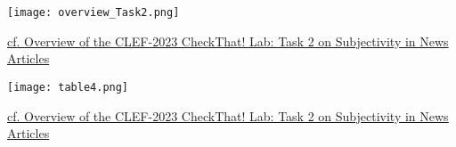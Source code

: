 \documentclass[11pt]{rapport_class}
\begin{document}
\begin{center}
\texttt{[image: overview\_Task2.png]}\\
\begin{tiny}
    \href{https://ceur-ws.org/Vol-3497/paper-020.pdf}{cf. Overview of the CLEF-2023 CheckThat! Lab: Task 2 on
Subjectivity in News Articles}\\
\end{tiny}
\end{center}

\begin{center}
\texttt{[image: table4.png]}\\
\begin{tiny}
    \href{https://ceur-ws.org/Vol-3497/paper-020.pdf}{cf. Overview of the CLEF-2023 CheckThat! Lab: Task 2 on
Subjectivity in News Articles}\\
\end{tiny}
\end{center}
\end{document}
